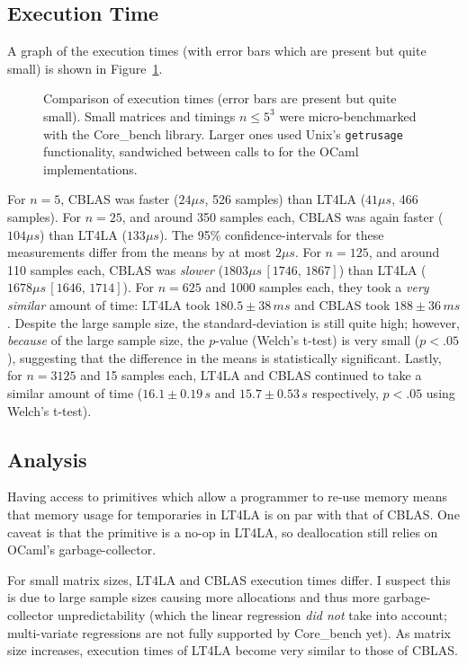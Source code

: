 \subsection{Execution Time}

A graph of the execution times (with error bars which are present but quite
small) is shown in Figure~\ref{fig:timings}.

\begin{figure}[t]
    \centering
    
    \caption{Comparison of execution times (error bars are present but quite
        small). Small matrices and timings $n \le 5^3$ were micro-benchmarked
        with the Core\_bench library. Larger ones used Unix's
        \texttt{getrusage} functionality, sandwiched between calls to
         for the OCaml implementations.}\label{fig:timings}
\end{figure}

For $n=5$, CBLAS was faster ($24\mu s$, 526 samples) than LT4LA ($41 \mu s$,
466 samples).  For $n=25$, and around 350 samples each, CBLAS was again faster
($104 \mu s$) than LT4LA ($133 \mu s$). The 95\% confidence-intervals for these
measurements differ from the means by at most $2 \mu s$. For $n=125$, and
around 110 samples each, CBLAS was \emph{slower} ($1803 \mu s\, [1746,\, 1867]$)
than LT4LA ($1678 \mu s\, [1646,\, 1714]$). For $n=625$ and 1000 samples each,
they took a \emph{very similar} amount of time: LT4LA took $180.5 \pm 38 \,ms$
and CBLAS took $188 \pm 36 \, ms$. Despite the large sample size, the
standard-deviation is still quite high; however, \emph{because} of the large
sample size, the $p$-value (Welch's t-test) is very small ($p < .05$),
suggesting that the difference in the means is statistically significant.
Lastly, for $n=3125$ and 15 samples each, LT4LA and CBLAS continued to take a
similar amount of time ($16.1 \pm 0.19 \,s$ and $15.7 \pm 0.53 \,s$
respectively, $p<.05$ using Welch's t-test).

\subsection{Analysis}

Having access to primitives which allow a programmer to re-use memory means
that memory usage for temporaries in LT4LA is on par with that of CBLAS. One
caveat is that the  primitive is a no-op in LT4LA, so deallocation
still relies on OCaml's garbage-collector.

For small matrix sizes, LT4LA and CBLAS execution times differ. I suspect this
is due to large sample sizes causing more allocations and thus more
garbage-collector unpredictability (which the linear regression \emph{did not}
take into account; multi-variate regressions are not fully supported by
Core\_bench yet). As matrix size increases, execution times of LT4LA become
very similar to those of CBLAS.

